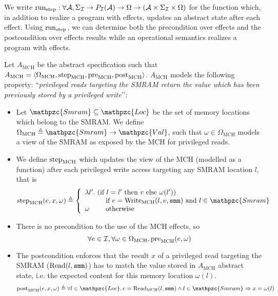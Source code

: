 We write
$\mathrm{run}_{\mathrm{step}} : \forall \mathcal{A}, \Sigma_{\mathcal{I}} \rightarrow
P_{\mathcal{I}}(\mathcal{A}) \rightarrow \Omega \rightarrow (\mathcal{A} \times
\Sigma_{\mathcal{I}} \times \Omega)$ for the function which, in addition to realize a
program with effects, updates an abstract state after each effect.
%
Using $\mathrm{run}_{\mathrm{step}}$, we can determine both the precondition over
effects and the postcondition over effects results while an operational
semantics realizes a program with effects.

\begin{example} \label{ex:mch-abs-specs} Let
  $A_{\mathrm{MCH}}$ be the abstract specification such that
  $A_{\mathrm{MCH}} = \langle \Omega_{\mathrm{MCH}}, \mathrm{step}_{\mathrm{MCH}},
  \mathrm{pre}_{\mathrm{MCH}}, \mathrm{post}_{\mathrm{MCH}} \rangle$.
  $A_{\mathrm{MCH}}$ models the following property: ``\emph{privileged reads
    targeting the SMRAM return the value which has been previously stored by a
    privileged write}’’:
  \begin{itemize}
  \item Let $\mathpzc{Smram} \subseteq \mathpzc{Loc}$ be the set of memory
    locations which belong to the SMRAM.  We define
    $\Omega_{\mathrm{MCH}} \triangleq \mathpzc{Smram} \rightarrow
    \mathpzc{Val}$, such that $\omega \in \Omega_{\mathrm{MCH}}$ models a view
    of the SMRAM as exposed by the MCH for privileged reads.
  \item We define $\mathrm{step}_{\mathrm{MCH}}$ which updates the view of the MCH
    (modelled as a function) after each privileged write access targeting any
    SMRAM location $l$, that is
    \[ \func{step}_{\mathrm{MCH}}(e, x, \omega) \triangleq \left\{
        \begin{array}{l}
          \lambda l'.  \text{ (if } l = l' \text{ then } v \text{ else } \omega(l')) \\
          \qquad\ \ \text{ if } e = \func{Write}_{\mathrm{MCH}}(l, v, \val{smm})
          \text{ and } l \in \mathpzc{Smram} \\
          \omega \qquad \text{ otherwise}
        \end{array}
      \right.
    \]
  \item There is no precondition to the use of the MCH effects, so
    \[ \forall e \in \mathcal{I},\forall \omega \in \Omega_{\mathrm{MCH}},
      \mathrm{pre}_{\mathrm{MCH}}(e, \omega) \]
  \item The postcondition enforces that the result $x$ of a privileged read
    targeting the SMRAM ($\mathrm{Read}(l, \mathtt{smm})$) has to match the value
    stored in $A_{\mathrm{MCH}}$ abstract state, i.e. the expected content for
    this memory location $\omega(l)$.
    \[ \func{post}_{\mathrm{MCH}}(e, x, \omega) \triangleq \forall l \in
      \mathpzc{Loc}, e = \func{Read}_{\mathrm{MCH}}(l, \val{smm}) \wedge l \in
      \mathpzc{Smram} \Rightarrow x = \omega(l)
    \]
  \end{itemize}
\end{example}

